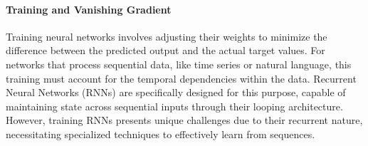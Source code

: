 \paragraph{Training and Vanishing Gradient}
Training neural networks involves adjusting their weights to minimize the difference between the predicted output and the actual target values.
For networks that process sequential data, like time series or natural language, this training must account for the temporal dependencies within the data.
Recurrent Neural Networks (RNNs) are specifically designed for this purpose, capable of maintaining state across sequential inputs through their looping architecture. 
However, training RNNs presents unique challenges due to their recurrent nature, necessitating specialized techniques to effectively learn from sequences. 


